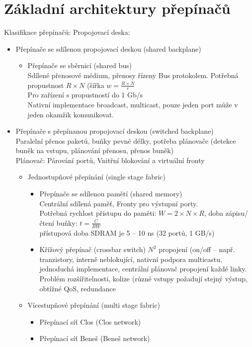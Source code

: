 \documentclass[a4paper, 11pt]{report}
\begin{document}
\section{Základní architektury přepínačů}
Klasifikace přepínačů: Propojovací deska:
\begin{itemize}
	\item Přepínače se sdílenou propojovací deskou (shared backplane)
	\begin{itemize}
		\item Přepínače se sběrnicí (shared bus)\\
		Sdílené přenosové médium, přenosy řízeny Bus protokolem. Potřebná propustnost $R \times N$ (šířka $w = \frac{R \times N}{r}$\\
		Pro zařízení s propustností do 1 Gb/s\\
		Nativní implementace broadcast, multicast, pouze jeden port může v jeden okamžik komunikovat.
	\end{itemize}
	\item Přepínače s přepínanou propojovací deskou (switched backplane)\\
	Paralelní přenos paketů, buňky pevné délky, potřeba plánovače (detekce buněk na vstupu, plánování přenosu, přenos buněk)\\
	Plánovač: Párování portů, Vnitřní blokování a virtuální fronty
	\begin{itemize}
		\item Jednostupňové přepínání (single stage fabric)
		\begin{itemize}
			\item Přepínače se sdílenou pamětí (shared memory)\\
			Centrální sdílená paměť, Fronty pro výstupní porty.\\
			Potřebná rychlost přístupu do paměti: $W = 2 \times N \times R$, doba zápisu/čtení buňky: $t = \frac{C}{BW}$\\
			přístupová doba SDRAM je 5 -- 10 ns (32 portů, 1 GB/s)
			\item Křížový přepínač (crossbar switch)
			$N^2$ propojení (on/off -- např. tranzistory, interně neblokující, nativní podpora multicastu, jednoduchá implementace, centrální plánovač propojení každé linky.\\
			Problém rozšířitelnosti, kolize (různé vstupy požadují stejný výstup, obtížné QoS, redundance
		\end{itemize}
		\item Vícestupňové přepínání (multi stage fabric)
		\begin{itemize}
			\item Přepínací síť Clos (Clos network)
			\item Přepínací síť Beneš (Beneš network)
		\end{itemize}
	\end{itemize}
\end{itemize}
\end{document}
